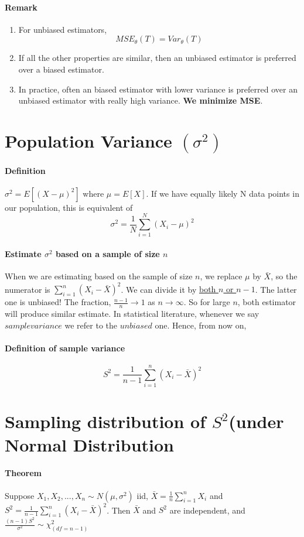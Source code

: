 \documentclass[11pt]{article}
\newcommand{\tb}[1]{\textbf{#1}}
\newcommand{\under}[1]{\underline{#1}}
\begin{document}
\paragraph{Remark}
\begin{enumerate}
	\item For unbiased estimators, $$MSE_\theta(T) = Var_\theta(T)$$
	\item If all the other properties are similar, then an unbiased estimator is preferred over a biased estimator.
	\item In practice, often an biased estimator with lower variance is preferred over an unbiased estimator with really high variance. \tb{We minimize MSE}.
\end{enumerate}
\section{Population Variance $(\sigma^2)$}
\paragraph{Definition} $\sigma^2 = E[(X - \mu)^2]$ where $\mu = E[X]$. \newline
If we have equally likely N data points in our population, this is equivalent of $$\sigma^2 = \frac{1}{N}\sum_{i = 1}^N(X_i - \mu)^2$$
\paragraph{Estimate $\sigma^2$ based on a sample of size $n$}
When we are estimating based on the sample of size $n$, we replace $\mu$ by $\bar X$, so the numerator is $\sum_{i=1}^n(X_i-\bar X)^2$. We can divide it by \under{both $n$ or $n-1$}. The latter one is unbiased! \newline
The fraction, $\frac{n-1}{n} \rightarrow 1$ as $n \rightarrow \infty$. So for large $n$, both estimator will produce similar estimate. In statistical literature, whenever we say $sample variance$ we refer to the $unbiased$ one. Hence, from now on,
\paragraph{Definition of sample variance}
$$S^2 = \frac{1}{n-1}\sum_{i=1}^n(X_i - \bar X)^2$$
\section{Sampling distribution of $S^2$(under Normal Distribution}
\paragraph{Theorem} Suppose $X_1, X_2,...,X_n \sim N(\mu,\sigma^2)$ iid,
$\bar X = \frac{1}{n}\sum_{i=1}^nX_i$ and $S^2 = \frac{1}{n-1}\sum_{i=1}^n(X_i - \bar X)^2$. \newline
Then $\bar X$ and $S^2$ are independent, and $\frac{(n-1)S^2}{\sigma^2} \sim \chi_{(df=n-1)}^2$
\end{document}
